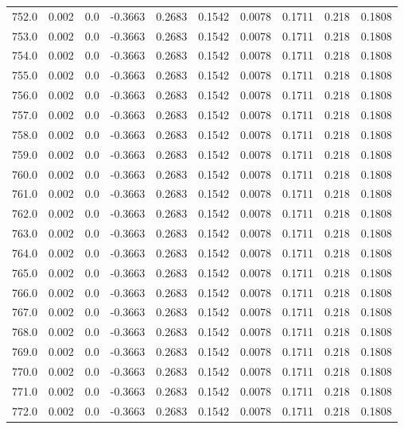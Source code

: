\begin{longtable}{lrrrrrrrrr}
752.0 & 0.002 & 0.0 & -0.3663 & 0.2683 & 0.1542 & 0.0078 & 0.1711 & 0.218 & 0.1808 \\
753.0 & 0.002 & 0.0 & -0.3663 & 0.2683 & 0.1542 & 0.0078 & 0.1711 & 0.218 & 0.1808 \\
754.0 & 0.002 & 0.0 & -0.3663 & 0.2683 & 0.1542 & 0.0078 & 0.1711 & 0.218 & 0.1808 \\
755.0 & 0.002 & 0.0 & -0.3663 & 0.2683 & 0.1542 & 0.0078 & 0.1711 & 0.218 & 0.1808 \\
756.0 & 0.002 & 0.0 & -0.3663 & 0.2683 & 0.1542 & 0.0078 & 0.1711 & 0.218 & 0.1808 \\
757.0 & 0.002 & 0.0 & -0.3663 & 0.2683 & 0.1542 & 0.0078 & 0.1711 & 0.218 & 0.1808 \\
758.0 & 0.002 & 0.0 & -0.3663 & 0.2683 & 0.1542 & 0.0078 & 0.1711 & 0.218 & 0.1808 \\
759.0 & 0.002 & 0.0 & -0.3663 & 0.2683 & 0.1542 & 0.0078 & 0.1711 & 0.218 & 0.1808 \\
760.0 & 0.002 & 0.0 & -0.3663 & 0.2683 & 0.1542 & 0.0078 & 0.1711 & 0.218 & 0.1808 \\
761.0 & 0.002 & 0.0 & -0.3663 & 0.2683 & 0.1542 & 0.0078 & 0.1711 & 0.218 & 0.1808 \\
762.0 & 0.002 & 0.0 & -0.3663 & 0.2683 & 0.1542 & 0.0078 & 0.1711 & 0.218 & 0.1808 \\
763.0 & 0.002 & 0.0 & -0.3663 & 0.2683 & 0.1542 & 0.0078 & 0.1711 & 0.218 & 0.1808 \\
764.0 & 0.002 & 0.0 & -0.3663 & 0.2683 & 0.1542 & 0.0078 & 0.1711 & 0.218 & 0.1808 \\
765.0 & 0.002 & 0.0 & -0.3663 & 0.2683 & 0.1542 & 0.0078 & 0.1711 & 0.218 & 0.1808 \\
766.0 & 0.002 & 0.0 & -0.3663 & 0.2683 & 0.1542 & 0.0078 & 0.1711 & 0.218 & 0.1808 \\
767.0 & 0.002 & 0.0 & -0.3663 & 0.2683 & 0.1542 & 0.0078 & 0.1711 & 0.218 & 0.1808 \\
768.0 & 0.002 & 0.0 & -0.3663 & 0.2683 & 0.1542 & 0.0078 & 0.1711 & 0.218 & 0.1808 \\
769.0 & 0.002 & 0.0 & -0.3663 & 0.2683 & 0.1542 & 0.0078 & 0.1711 & 0.218 & 0.1808 \\
770.0 & 0.002 & 0.0 & -0.3663 & 0.2683 & 0.1542 & 0.0078 & 0.1711 & 0.218 & 0.1808 \\
771.0 & 0.002 & 0.0 & -0.3663 & 0.2683 & 0.1542 & 0.0078 & 0.1711 & 0.218 & 0.1808 \\
772.0 & 0.002 & 0.0 & -0.3663 & 0.2683 & 0.1542 & 0.0078 & 0.1711 & 0.218 & 0.1808 \\

\end{longtable}
